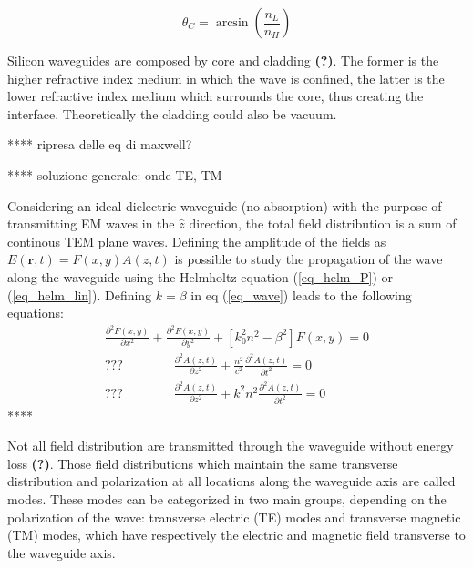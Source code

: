 \documentclass[12pt,a4paper,twoside]{article}
\begin{document}
$$	\theta_C = \arcsin \left( \frac{n_L}{n_H} \right)$$

Silicon waveguides are composed by core and cladding \textbf{(?)}. %
The former is the higher refractive index medium in which the wave is confined, the latter is the lower refractive index medium which surrounds the core, thus creating the interface. Theoretically the cladding could also be vacuum.

\vspace{18pt}
**** ripresa delle eq di maxwell?

**** soluzione generale: onde TE, TM
\vspace{12pt}

Considering an ideal dielectric waveguide (no absorption) with the purpose of transmitting EM waves in the $\hat{z}$ direction, the total field distribution is a sum of continous TEM plane waves.
Defining the amplitude of the fields as $E(\textbf{r},t) = F(x,y)A(z,t)$ is possible to study the propagation of the wave along the waveguide using the Helmholtz equation (\ref{eq_helm_P}) or (\ref{eq_helm_lin}).
\vspace{18pt}
Defining $k=\beta$ in eq (\ref{eq_wave}) leads to the following equations:
\begin{subequations}
\begin{align}
	\frac{\partial^2F(x,y)}{\partial x^2} + \frac{\partial^2F(x,y)}{\partial y^2} + \left[ k_0^2n^2-\beta^2\right]F(x,y) = 0 \\
	??? \qquad \qquad \frac{\partial^2A(z,t)}{\partial z^2} + \frac{n^2}{c^2}\frac{\partial^2A(z,t)}{\partial t^2} = 0 \\
	??? \qquad \qquad \frac{\partial^2A(z,t)}{\partial z^2} + k^2n^2\frac{\partial^2A(z,t)}{\partial t^2} = 0
\end{align}
\end{subequations}
\vspace{18pt}
****
\vspace{12pt}

Not all field distribution are transmitted through the waveguide without energy loss \textbf{(?)}.
Those field distributions which maintain the same transverse distribution and polarization at all locations along the waveguide axis are called modes.
These modes can be categorized in two main groups, depending on the polarization of the wave: transverse electric (TE) modes and transverse magnetic (TM) modes, which have respectively the electric and magnetic field transverse to the waveguide axis.
\end{document}
